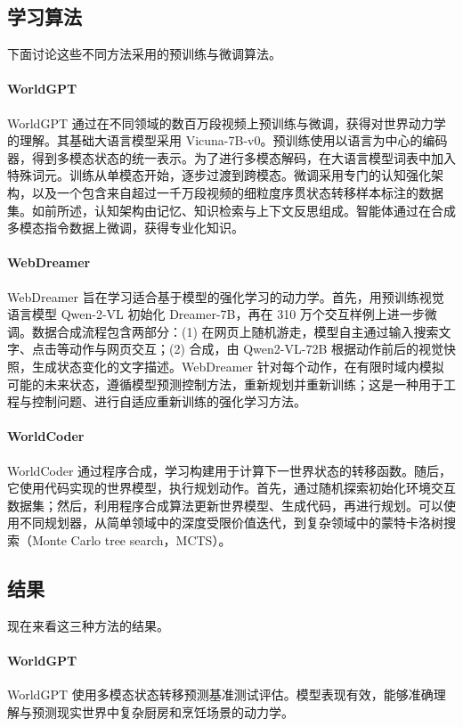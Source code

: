 \subsection{学习算法}
下面讨论这些不同方法采用的预训练与微调算法。

\paragraph{WorldGPT}
WorldGPT 通过在不同领域的数百万段视频上预训练与微调，获得对世界动力学的理解。其基础大语言模型采用 Vicuna-7B-v0。预训练使用以语言为中心的编码器，得到多模态状态的统一表示。为了进行多模态解码，在大语言模型词表中加入特殊词元。训练从单模态开始，逐步过渡到跨模态。微调采用专门的认知强化架构，以及一个包含来自超过一千万段视频的细粒度序贯状态转移样本标注的数据集。如前所述，认知架构由记忆、知识检索与上下文反思组成。智能体通过在合成多模态指令数据上微调，获得专业化知识。

\paragraph{WebDreamer} WebDreamer 旨在学习适合基于模型的强化学习的动力学。首先，用预训练视觉语言模型 Qwen-2-VL \citep{wang2024qwen2} 初始化 Dreamer-7B，再在 310 万个交互样例上进一步微调。数据合成流程包含两部分：(1) 在网页上随机游走，模型自主通过输入搜索文字、点击等动作与网页交互；(2) 合成，由 Qwen2-VL-72B 根据动作前后的视觉快照，生成状态变化的文字描述。WebDreamer 针对每个动作，在有限时域内模拟可能的未来状态，遵循模型预测控制方法，重新规划并重新训练；这是一种用于工程与控制问题、进行自适应重新训练的强化学习方法。

\paragraph{WorldCoder}
WorldCoder 通过程序合成，学习构建用于计算下一世界状态的转移函数。随后，它使用代码实现的世界模型，执行规划动作。首先，通过随机探索初始化环境交互数据集；然后，利用程序合成算法更新世界模型、生成代码，再进行规划。可以使用不同规划器，从简单领域中的深度受限价值迭代，到复杂领域中的蒙特卡洛树搜索（Monte Carlo tree search，MCTS）\citep{browne2012survey}。

\subsection{结果}
现在来看这三种方法的结果。

\paragraph{WorldGPT} WorldGPT 使用多模态状态转移预测基准测试评估。模型表现有效，能够准确理解与预测现实世界中复杂厨房和烹饪场景的动力学。

